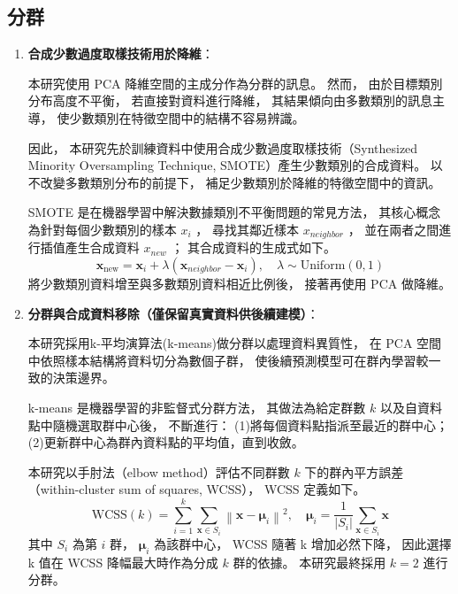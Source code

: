 \documentclass[12pt,a4paper,oneside]{book}
\begin{document}
	\subsection{分群}
	\begin{enumerate}

	\item \textbf{合成少數過度取樣技術用於降維}：
	
	本研究使用 PCA 降維空間的主成分作為分群的訊息。
	然而，
	由於目標類別分布高度不平衡，
	若直接對資料進行降維，
	其結果傾向由多數類別的訊息主導，
	使少數類別在特徵空間中的結構不容易辨識。

	因此，
	本研究先於訓練資料中使用合成少數過度取樣技術（Synthesized Minority Oversampling Technique, SMOTE）產生少數類別的合成資料。
	以不改變多數類別分布的前提下，
	補足少數類別於降維的特徵空間中的資訊。

	SMOTE 是在機器學習中解決數據類別不平衡問題的常見方法，
	其核心概念為針對每個少數類別的樣本 $x_i$ ，
	尋找其鄰近樣本 $x_{neighbor}$ ，
	並在兩者之間進行插值產生合成資料 $x_{new}$ ；
	其合成資料的生成式如下。
	$$
	\mathbf{x}_{\text{new}}=\mathbf{x}_i+\lambda\left(\mathbf{x}_{neighbor}-\mathbf{x}_i\right),\quad \lambda\sim\mathrm{Uniform}(0,1)
	$$
	將少數類別資料增至與多數類別資料相近比例後，
	接著再使用 PCA 做降維。

	
	\item \textbf{分群與合成資料移除（僅保留真實資料供後續建模）}：
	
	本研究採用k-平均演算法(k-means)做分群以處理資料異質性，
	在 PCA 空間中依照樣本結構將資料切分為數個子群，
	使後續預測模型可在群內學習較一致的決策邊界。

	k-means 是機器學習的非監督式分群方法，
	其做法為給定群數 $k$ 以及自資料點中隨機選取群中心後，
	不斷進行：
	(1)將每個資料點指派至最近的群中心；
	(2)更新群中心為群內資料點的平均值，直到收斂。

	本研究以手肘法（elbow method）評估不同群數 $k$ 下的群內平方誤差（within-cluster sum of squares, WCSS），
	WCSS 定義如下。
	$$
	\mathrm{WCSS}(k)=\sum_{i=1}^{k}\sum_{\mathbf{x}\in S_i}\left\|\mathbf{x}-\boldsymbol{\mu}_i\right\|^2,\quad 
	\boldsymbol{\mu}_i=\frac{1}{|S_i|}\sum_{\mathbf{x}\in S_i}\mathbf{x}
	$$
	其中 \(S_i\) 為第 \(i\) 群，
	\(\boldsymbol{\mu}_i\) 為該群中心，
	WCSS 隨著 k 增加必然下降，
	因此選擇 k 值在 WCSS 降幅最大時作為分成 $k$ 群的依據。
	本研究最終採用 $k=2$ 進行分群。


\end{enumerate}
\end{document}
